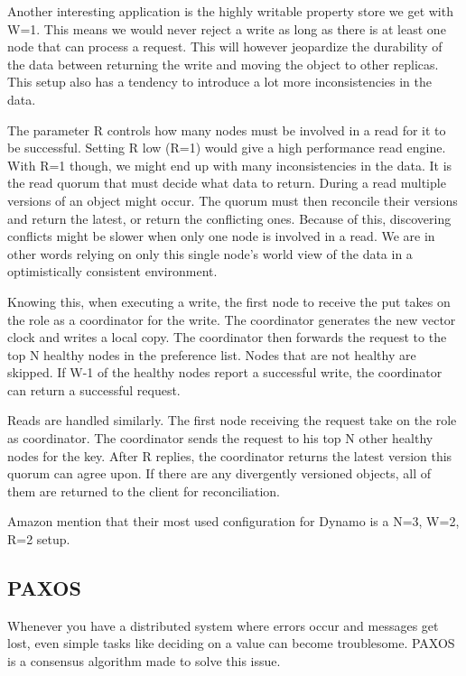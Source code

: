 Another interesting application is the highly writable property store we get with W=1. This means we would never reject a write as long as there is at least one node that can process a request. This will however jeopardize the durability of the data between returning the write and moving the object to other replicas. This setup also has a tendency to introduce a lot more inconsistencies in the data\cite{dynamo}.

The parameter R controls how many nodes must be involved in a read for it to be successful. Setting R low (R=1) would give a high performance read engine. With R=1 though, we might end up with many inconsistencies in the data. It is the read quorum that must decide what data to return. During a read multiple versions of an object might occur. The quorum must then reconcile their versions and return the latest, or return the conflicting ones.
Because of this, discovering conflicts might be slower when only one node is involved in a read. We are in other words relying on only this single node's world view of the data in a optimistically consistent environment.

Knowing this, when executing a write, the first node to receive the put takes on the role as a coordinator for the write. The coordinator generates the new vector clock and writes a local copy. The coordinator then forwards the request to the top N healthy nodes in the preference list. Nodes that are not healthy are skipped. If W-1 of the healthy nodes report a successful write, the coordinator can return a successful request. 

Reads are handled similarly. The first node receiving the request take on the role as coordinator. The coordinator sends the request to his top N other healthy nodes for the key. After R replies, the coordinator returns the latest version this quorum can agree upon. If there are any divergently versioned objects, all of them are returned to the client for reconciliation.

Amazon\cite{dynamo} mention that their most used configuration for Dynamo is a N=3, W=2, R=2 setup.

\subsection{PAXOS}
Whenever you have a distributed system where errors occur and messages get lost, even simple tasks like deciding on a value can become troublesome. PAXOS is a consensus algorithm made to solve this issue. 

